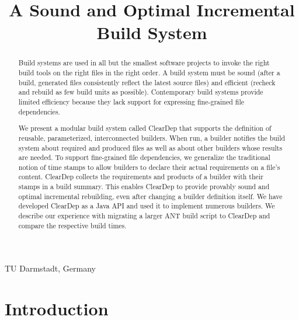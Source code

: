 \documentclass[preprint,10pt]{sigplanconf}
\begin{document}
\title{A Sound and Optimal Incremental Build System}
%
%
%

{TU Darmstadt, Germany}

\maketitle

\newcommand{\projectname}{ClearDep\xspace}

\begin{abstract}
  Build systems are used in all but the smallest software projects to invoke the
  right build tools on the right files in the right order.  A build system must
  be sound (after a build, generated files consistently reflect the latest
  source files) and efficient (recheck and rebuild as few build units as
  possible). Contemporary build systems provide limited efficiency because they
  lack support for expressing fine-grained file dependencies.

  We present a modular build system called \projectname that supports the
  definition of reusable, parameterized, interconnected builders. When run, a
  builder notifies the build system about required and produced files as well as
  about other builders whose results are needed. To support fine-grained file
  dependencies, we generalize the traditional notion of time stamps to allow
  builders to declare their actual requirements on a file's content.
  \projectname collects the requirements and products of a builder with their
  stamps in a build summary. This enables \projectname to provide provably
  sound and optimal incremental rebuilding, even after changing a builder
  definition itself. We have developed \projectname as a Java API and used it to
  implement numerous builders. We describe our experience with migrating a
  larger ANT build script to \projectname and compare the respective
  build times.
\end{abstract}

\section{Introduction}





\end{document}
